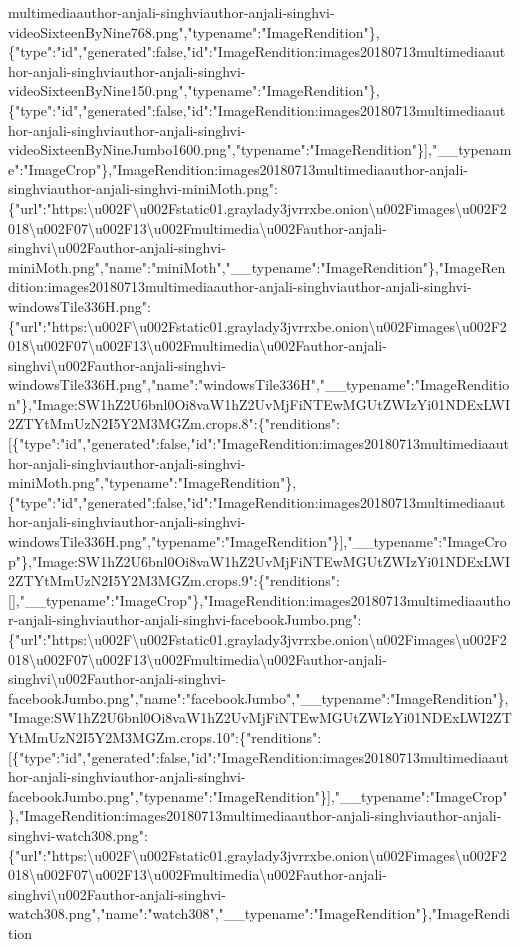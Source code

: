 multimediaauthor-anjali-singhviauthor-anjali-singhvi-videoSixteenByNine768.png","typename":"ImageRendition"\},\{"type":"id","generated":false,"id":"ImageRendition:images20180713multimediaauthor-anjali-singhviauthor-anjali-singhvi-videoSixteenByNine150.png","typename":"ImageRendition"\},\{"type":"id","generated":false,"id":"ImageRendition:images20180713multimediaauthor-anjali-singhviauthor-anjali-singhvi-videoSixteenByNineJumbo1600.png","typename":"ImageRendition"\}{]},"\_\_typename":"ImageCrop"\},"ImageRendition:images20180713multimediaauthor-anjali-singhviauthor-anjali-singhvi-miniMoth.png":\{"url":"https:\textbackslash{}u002F\textbackslash{}u002Fstatic01.graylady3jvrrxbe.onion\textbackslash{}u002Fimages\textbackslash{}u002F2018\textbackslash{}u002F07\textbackslash{}u002F13\textbackslash{}u002Fmultimedia\textbackslash{}u002Fauthor-anjali-singhvi\textbackslash{}u002Fauthor-anjali-singhvi-miniMoth.png","name":"miniMoth","\_\_typename":"ImageRendition"\},"ImageRendition:images20180713multimediaauthor-anjali-singhviauthor-anjali-singhvi-windowsTile336H.png":\{"url":"https:\textbackslash{}u002F\textbackslash{}u002Fstatic01.graylady3jvrrxbe.onion\textbackslash{}u002Fimages\textbackslash{}u002F2018\textbackslash{}u002F07\textbackslash{}u002F13\textbackslash{}u002Fmultimedia\textbackslash{}u002Fauthor-anjali-singhvi\textbackslash{}u002Fauthor-anjali-singhvi-windowsTile336H.png","name":"windowsTile336H","\_\_typename":"ImageRendition"\},"Image:SW1hZ2U6bnl0Oi8vaW1hZ2UvMjFiNTEwMGUtZWIzYi01NDExLWI2ZTYtMmUzN2I5Y2M3MGZm.crops.8":\{"renditions":{[}\{"type":"id","generated":false,"id":"ImageRendition:images20180713multimediaauthor-anjali-singhviauthor-anjali-singhvi-miniMoth.png","typename":"ImageRendition"\},\{"type":"id","generated":false,"id":"ImageRendition:images20180713multimediaauthor-anjali-singhviauthor-anjali-singhvi-windowsTile336H.png","typename":"ImageRendition"\}{]},"\_\_typename":"ImageCrop"\},"Image:SW1hZ2U6bnl0Oi8vaW1hZ2UvMjFiNTEwMGUtZWIzYi01NDExLWI2ZTYtMmUzN2I5Y2M3MGZm.crops.9":\{"renditions":{[}{]},"\_\_typename":"ImageCrop"\},"ImageRendition:images20180713multimediaauthor-anjali-singhviauthor-anjali-singhvi-facebookJumbo.png":\{"url":"https:\textbackslash{}u002F\textbackslash{}u002Fstatic01.graylady3jvrrxbe.onion\textbackslash{}u002Fimages\textbackslash{}u002F2018\textbackslash{}u002F07\textbackslash{}u002F13\textbackslash{}u002Fmultimedia\textbackslash{}u002Fauthor-anjali-singhvi\textbackslash{}u002Fauthor-anjali-singhvi-facebookJumbo.png","name":"facebookJumbo","\_\_typename":"ImageRendition"\},"Image:SW1hZ2U6bnl0Oi8vaW1hZ2UvMjFiNTEwMGUtZWIzYi01NDExLWI2ZTYtMmUzN2I5Y2M3MGZm.crops.10":\{"renditions":{[}\{"type":"id","generated":false,"id":"ImageRendition:images20180713multimediaauthor-anjali-singhviauthor-anjali-singhvi-facebookJumbo.png","typename":"ImageRendition"\}{]},"\_\_typename":"ImageCrop"\},"ImageRendition:images20180713multimediaauthor-anjali-singhviauthor-anjali-singhvi-watch308.png":\{"url":"https:\textbackslash{}u002F\textbackslash{}u002Fstatic01.graylady3jvrrxbe.onion\textbackslash{}u002Fimages\textbackslash{}u002F2018\textbackslash{}u002F07\textbackslash{}u002F13\textbackslash{}u002Fmultimedia\textbackslash{}u002Fauthor-anjali-singhvi\textbackslash{}u002Fauthor-anjali-singhvi-watch308.png","name":"watch308","\_\_typename":"ImageRendition"\},"ImageRendition